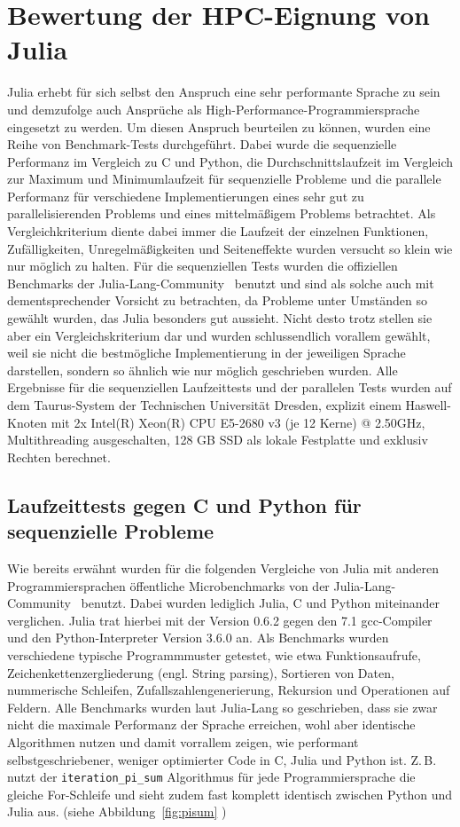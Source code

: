 \documentclass[proseminar,german,utf8]{zihpub}
\newcommand{\ZB}[0]{{Z.\,B. }}
\begin{document}
\section{Bewertung der HPC-Eignung von Julia}
Julia erhebt für sich selbst den Anspruch eine sehr performante Sprache zu sein und demzufolge auch Ansprüche als High-Performance-Programmiersprache eingesetzt zu werden. Um diesen Anspruch beurteilen zu können, wurden eine Reihe von Benchmark-Tests durchgeführt. Dabei wurde die sequenzielle Performanz im Vergleich zu C und Python, die Durchschnittslaufzeit im Vergleich zur Maximum und Minimumlaufzeit für sequenzielle Probleme und die parallele Performanz für verschiedene Implementierungen eines sehr gut zu parallelisierenden Problems und eines mittelmäßigem Problems betrachtet. Als Vergleichkriterium diente dabei immer die Laufzeit der einzelnen Funktionen, Zufälligkeiten, Unregelmäßigkeiten und Seiteneffekte wurden versucht so klein wie nur möglich zu halten. Für die sequenziellen Tests wurden die offiziellen Benchmarks der Julia-Lang-Community~\cite{JuliaMicroBenchmarks} benutzt und sind als solche auch mit dementsprechender Vorsicht zu betrachten, da Probleme unter Umständen so gewählt wurden, das Julia besonders gut aussieht. Nicht desto trotz stellen sie aber ein Vergleichskriterium dar und wurden schlussendlich vorallem gewählt, weil sie nicht die bestmögliche Implementierung in der jeweiligen Sprache darstellen, sondern so ähnlich wie nur möglich geschrieben wurden. Alle Ergebnisse für die sequenziellen Laufzeittests und der parallelen Tests wurden auf dem Taurus-System der Technischen Universität Dresden, explizit einem Haswell-Knoten mit 2x Intel(R) Xeon(R) CPU E5-2680 v3 (je 12 Kerne) @ 2.50GHz, Multithreading ausgeschalten, 128 GB SSD als lokale Festplatte und exklusiv Rechten berechnet. 

\subsection{Laufzeittests gegen C und Python für sequenzielle Probleme}

Wie bereits erwähnt wurden für die folgenden Vergleiche von Julia mit anderen Programmiersprachen öffentliche Microbenchmarks von der Julia-Lang-Community~\cite{JuliaMicroBenchmarks} benutzt. Dabei wurden lediglich Julia, C und Python miteinander verglichen. Julia trat hierbei mit der Version 0.6.2 gegen den 7.1 gcc-Compiler und den Python-Interpreter Version 3.6.0 an. Als Benchmarks wurden verschiedene typische Programmmuster getestet, wie etwa Funktionsaufrufe, Zeichenkettenzergliederung (engl. String parsing), Sortieren von Daten, nummerische Schleifen, Zufallszahlengenerierung, Rekursion und Operationen auf Feldern. Alle Benchmarks wurden laut Julia-Lang so geschrieben, dass sie zwar nicht die maximale Performanz der Sprache erreichen, wohl aber identische Algorithmen nutzen und damit vorrallem zeigen, wie performant selbstgeschriebener, weniger optimierter Code in C, Julia und Python ist. \ZB nutzt der \verb|iteration_pi_sum| Algorithmus für jede Programmiersprache die gleiche For-Schleife und sieht zudem fast komplett identisch zwischen Python und Julia aus. (siehe Abbildung~\ref{fig:pisum} )
\end{document}
